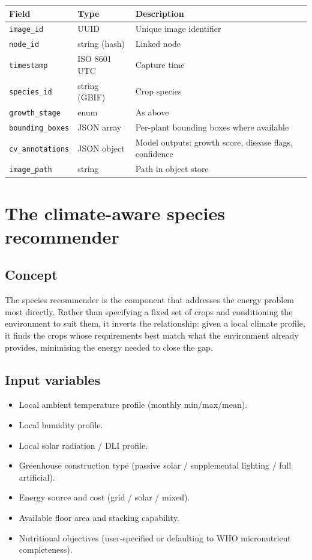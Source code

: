 \begin{center}
\begin{tabular}{p{4cm}p{4cm}p{5cm}}
\toprule
\textbf{Field} & \textbf{Type} & \textbf{Description} \\
\midrule
\texttt{image\_id} & UUID & Unique image identifier \\
\texttt{node\_id} & string (hash) & Linked node \\
\texttt{timestamp} & ISO 8601 UTC & Capture time \\
\texttt{species\_id} & string (GBIF) & Crop species \\
\texttt{growth\_stage} & enum & As above \\
\texttt{bounding\_boxes} & JSON array & Per-plant bounding boxes where available \\
\texttt{cv\_annotations} & JSON object & Model outputs: growth score, disease flags, confidence \\
\texttt{image\_path} & string & Path in object store \\
\bottomrule
\end{tabular}
\end{center}


\section{The climate-aware species recommender}

\subsection{Concept}

The species recommender is the component that addresses the energy problem most directly. Rather than specifying a fixed set of crops and conditioning the environment to suit them, it inverts the relationship: given a local climate profile, it finds the crops whose requirements best match what the environment already provides, minimising the energy needed to close the gap.

\subsection{Input variables}

\begin{itemize}
  \item Local ambient temperature profile (monthly min/max/mean).
  \item Local humidity profile.
  \item Local solar radiation / DLI profile.
  \item Greenhouse construction type (passive solar / supplemental lighting / full artificial).
  \item Energy source and cost (grid / solar / mixed).
  \item Available floor area and stacking capability.
  \item Nutritional objectives (user-specified or defaulting to WHO micronutrient completeness).
\end{itemize}

